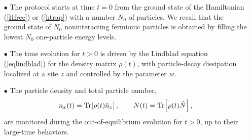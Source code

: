   \begin{itemize}
  
  \item[$\bullet$] The protocol starts at time $t=0$ from the ground
    state of the Hamiltonian (\ref{Hfree}) or (\ref{htrap}) with a
    number $N_0$ of particles. We recall that the ground state of $N_0$
    noninteracting fermionic particles is obtained by filling the lowest
    $N_0$ one-particle energy levels.
  
  \item[$\bullet$] The time evolution for $t>0$ is driven by the 
    Lindblad equation (\ref{eqlindblad}) for the density matrix
    $\rho(t)$, with particle-decay dissipation localized at a site $z$
    and controlled by the parameter $w$.
  
  \item[$\bullet$]
  The particle density and total particle number,  
  \begin{eqnarray}
  n_x(t) = {\rm Tr}[ \rho(t) \hat n_x ] \,,\qquad
  N(t) = {\rm Tr}\Bigr[ \rho(t) \hat N \Bigr] \,,
  \label{nxntdef}
  \end{eqnarray}
  are monitored during the out-of-equilibrium evolution for $t>0$, up to
  their large-time behaviors.
  
  \end{itemize}
  
